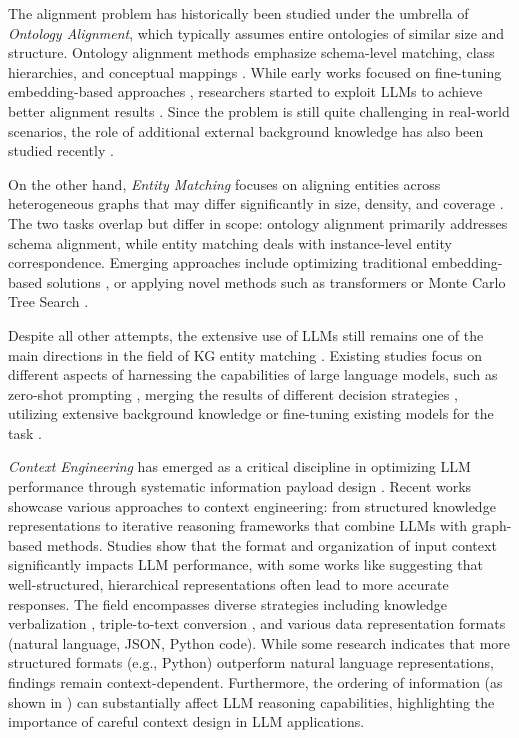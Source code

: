 \documentclass[11pt]{article}
\begin{document}
The alignment problem has historically been studied under the umbrella of \emph{Ontology Alignment}, which typically assumes entire ontologies of similar size and structure. Ontology alignment methods emphasize schema-level matching, class hierarchies, and conceptual mappings \cite{alignment_survey}. While early works focused on fine-tuning embedding-based approaches \cite{alignment_bertmap, alignment_embedding}, researchers started to exploit LLMs to achieve better alignment results \cite{alignment_llm_1, alignment_llm_2, alignment_llm_3}. Since the problem is still quite challenging in real-world scenarios, the role of additional external background knowledge has also been studied recently \cite{survey_background}.

On the other hand, \emph{Entity Matching} focuses on aligning entities across heterogeneous graphs that may differ significantly in size, density, and coverage \cite{matching_survey}. The two tasks overlap but differ in scope: ontology alignment primarily addresses schema alignment, while entity matching deals with instance-level entity correspondence. Emerging approaches include optimizing traditional embedding-based solutions \cite{matching_embedding}, or applying novel methods such as transformers \cite{matching_transformers} or Monte Carlo Tree Search \cite{matching_montecarlo}.

Despite all other attempts, the extensive use of LLMs still remains one of the main directions in the field of KG entity matching \cite{matching_chatgpt_survey, matching_llm_survey}. Existing studies focus on different aspects of harnessing the capabilities of large language models, such as zero-shot prompting \cite{matching_zeroshot}, merging the results of different decision strategies \cite{matching_multi_decision}, utilizing extensive background knowledge \cite{matching_background} or fine-tuning existing models for the task \cite{matching_finetune}.

\emph{Context Engineering} has emerged as a critical discipline in optimizing LLM performance through systematic information payload design \cite{context_survey}. Recent works showcase various approaches to context engineering: from structured knowledge representations \cite{jiang2023structgpt,fang2024karpa} to iterative reasoning frameworks \cite{luo2023reasoning_rog,sun2023think} that combine LLMs with graph-based methods. Studies show that the format and organization of input context significantly impacts LLM performance, with some works like \cite{liu2024_struxgpt} suggesting that well-structured, hierarchical representations often lead to more accurate responses. The field encompasses diverse strategies including knowledge verbalization \cite{ankush-etal-2023-kitlm}, triple-to-text conversion \cite{agarwal-etal-2021-knowledge}, and various data representation formats (natural language, JSON, Python code). While some research indicates that more structured formats (e.g., Python) outperform natural language representations, findings remain context-dependent. Furthermore, the ordering of information (as shown in \cite{ge2025graphdescriptiveorderaffect}) can substantially affect LLM reasoning capabilities, highlighting the importance of careful context design in LLM applications.
\end{document}
